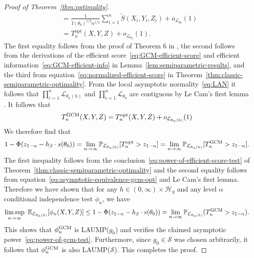 \documentclass[12pt]{article}
\theoremstyle{definition}
\theoremstyle{remark}
\newcommand{\E}{\mathbb E}								%
\renewcommand{\P}{\mathbb{P}}							%
\newcommand{\srx}{X}									%
\newcommand{\srz}{Z}									%
\newcommand{\sry}{Y}									%
\newcommand{\law}{\mathcal L}							%
\newcommand{\GCM}{\textnormal{GCM}}						%
\renewcommand{\H}{\mathcal H}		 					%
\begin{document}
\begin{proof}[Proof of Theorem~\ref{thm:optimality}]
\begin{equation}
\begin{split}
&= \frac{1}{\widetilde I(\theta_0)^{1/2}n^{1/2}}\sum_{i = 1}^n \widetilde S(\srx_i, \sry_i, \srz_i) + o_{\law_{\theta_0}}(1) \\
&= T_n^{\text{opt}}(\srx, \sry, \srz) + o_{\law_{\theta_0}}(1).
\end{split}
\label{eq:asymptotic-equivalence-gcm-opt}
\end{equation}
The first equality follows from the proof of Theorem 6 in \citet{Shah2018}, the second follows from the derivations of the efficient score~\eqref{eq:GCM-efficient-score} and efficient information~\eqref{eq:GCM-efficient-info} in Lemma~\ref{lem:semiparametric-results}, and the third from equation~\eqref{eq:normalized-efficient-score} in Theorem~\ref{thm:classic-semiparametric-optimality}. From the local asymptotic normality~\eqref{eq:LAN} it follows that $\prod_{i=1}^n\law_{\theta_{n}(h)}$ and $\prod_{i=1}^n\law_{\theta_0}$ are contiguous by Le Cam's first lemma \citep[Example 6.5]{VDV1998}. It follows that 
\begin{equation*}
	T^{\GCM}_n(\srx, \sry, \srz) = T_n^{\text{opt}}(\srx, \sry, \srz) + o_{\law_{\theta_{n}(h)}}(1)
\end{equation*}
We therefore find that
\begin{align*}
	1 - \Phi(z_{1-\alpha} - h_\beta \cdot s(\theta_0)) = \lim_{n\rightarrow\infty}\P_{\law_{\theta_{n}(h)}}[T_n^{\text{opt}}>z_{1-\alpha}]=\lim_{n\rightarrow\infty}\P_{\law_{\theta_{n}(h)}}[T_n^{\GCM}>z_{1-\alpha}].
\end{align*}
The first inequality follows from the conclusion~\eqref{eq:power-of-efficient-score-test} of Theorem~\ref{thm:classic-semiparametric-optimality} and the second equality follows from equation~\eqref{eq:asymptotic-equivalence-gcm-opt} and Le Cam's first lemma. Therefore we have shown that for any $h \in (0, \infty) \times \H_g$ and any level $\alpha$ conditional independence test $\phi_n$, we have
\begin{equation*}
\limsup_{n \rightarrow \infty}\ \E_{\law_{\theta_n(h)}}[\phi_n(\srx, \sry, \srz)] \leq 1 - \Phi(z_{1-\alpha} - h_\beta \cdot s(\theta_0)) = \lim_{n\rightarrow\infty}\P_{\law_{\theta_{n}(h)}}(T_n^{\GCM}>z_{1-\alpha}).
\end{equation*}
This shows that $\phi_n^{\GCM}$ is LAUMP($g_0$) and verifies the claimed asymptotic power~\eqref{eq:power-of-gcm-test}. Furthermore, since $g_0 \in \mathcal S$ was chosen arbitrarily, it follows that $\phi_n^{\GCM}$ is also LAUMP($\mathcal S$). This completes the proof.
\end{proof}
\end{document}
